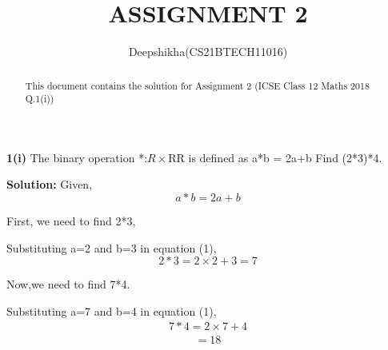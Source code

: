 \documentclass[journal, 12pt, twocolumn]{IEEEtran}
\begin{document}
\title{ASSIGNMENT 2}
\author{Deepshikha(CS21BTECH11016)}
\maketitle

\begin{abstract}
This document contains the solution for Assignment 2 (ICSE Class 12 Maths 2018 Q.1(i))
\end{abstract}

\textbf{1(i)}
The binary operation *:$R\times$R\textrightarrow R is defined as a*b = 2a+b Find (2*3)*4.


\textbf{Solution:}
Given,
\begin{equation}
     a*b=2a+b
\end{equation}

First, we need to find 2*3,


Substituting a=2 and b=3 in equation (1),
\begin{equation}
    2*3=2\times2+3=7
\end{equation}

Now,we need to find 7*4.


Substituting a=7 and b=4 in equation (1),
\begin{align*}
    7*4=2\times7+4
\end{align*}
\begin{align*}
      =18
\end{align*}
\end{document}
